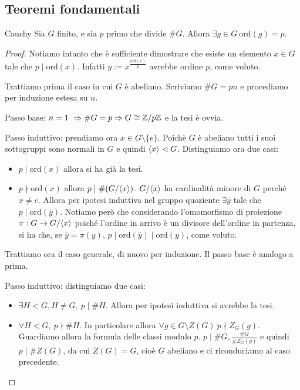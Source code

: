\subsection{Teoremi fondamentali}
\begin{theorem}{Cauchy}
    Sia $G$ finito, e sia $p$ primo che divide $\#G$. Allora $\exists g\in G \ \text{ord}(g) = p$.
\end{theorem}
\begin{proof}
    Notiamo intanto che è sufficiente dimostrare che esiste un elemento $x \in G$ tale che $p \mid \text{ord}(x)$. Infatti $y := x^{\frac{\text{ord}(x)}{p}}$ avrebbe ordine $p$, come voluto.
    
    Trattiamo prima il caso in cui $G$ è abeliano. Scriviamo $\#G = pn$ e procediamo per induzione estesa su $n$.
    
    Passo base: $n = 1 \ \Rightarrow \#G = p \Rightarrow G \cong \mathbb{Z}/p\mathbb{Z}$ e la tesi è ovvia.
    
    Passo induttivo: prendiamo ora $x \in G \setminus \{e\}$. Poichè $G$ è abeliano tutti i suoi sottogruppi sono normali in $G$ e quindi $\langle x \rangle \vartriangleleft G$. Distinguiamo ora due casi: 
    \begin{itemize}
        \item $p \mid \text{ord}(x)$ allora si ha già la tesi.
        \item $p \nmid \text{ord}(x)$ allora $p \mid \#(G/\langle x \rangle)$. $G/\langle x \rangle$ ha cardinalità minore di $G$ perché $x \neq e$. Allora per ipotesi induttiva nel gruppo quoziente $\exists \overline y$ tale che $p \mid \text{ord}(\overline y)$. Notiamo però che considerando l'omomorfismo di proiezione $\pi : G \rightarrow G/\langle x \rangle$ poiché l'ordine in arrivo è un divisore dell'ordine in partenza, si ha che, se $\overline y = \pi(y)$, $p \mid \text{ord}(\overline y) \mid \text{ord}(y)$, come voluto.
    \end{itemize}
    Trattiamo ora il caso generale, di nuovo per induzione. Il passo base è analogo a prima.
    
    Passo induttivo: distinguiamo due casi:
    \begin{itemize}
        \item $\exists H < G, H \neq G, \ p \mid \#H$. Allora per ipotesi induttiva si avrebbe la tesi. 
        \item $\forall H < G, \ p \nmid \#H$. In particolare allora $\forall g \in G \setminus Z(G) \ p \nmid Z_G(g)$. Guardiamo allora la formula delle classi modulo $p$. $p \mid \#G, \frac{\#G}{\#Z_G(g)}$ e quindi $p \mid \#Z(G)$, da cui $Z(G) = G$, cioè $G$ abeliano e ci riconduciamo al caso precedente.
    \end{itemize}


\end{proof}
